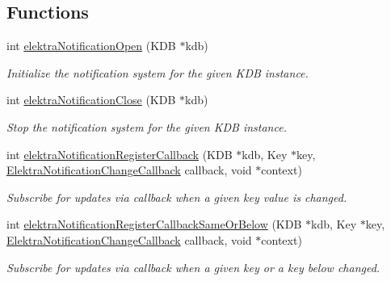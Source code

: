 \subsection*{Functions}
\begin{DoxyCompactItemize}
\item 
int \hyperlink{group__kdbnotification_gaeae96154abdb5fdbf1b34a01e2b23e44}{elektra\+Notification\+Open} (K\+DB $\ast$kdb)
\begin{DoxyCompactList}\small\item\em Initialize the notification system for the given K\+DB instance. \end{DoxyCompactList}\item 
int \hyperlink{group__kdbnotification_ga5685dafbd4131011365628d6d9213594}{elektra\+Notification\+Close} (K\+DB $\ast$kdb)
\begin{DoxyCompactList}\small\item\em Stop the notification system for the given K\+DB instance. \end{DoxyCompactList}\item 
int \hyperlink{group__kdbnotification_gab42738703162b3769b1336dcade47b18}{elektra\+Notification\+Register\+Callback} (K\+DB $\ast$kdb, Key $\ast$key, \hyperlink{group__kdbnotification_gad0d800e32a72d89780321e5723301eb9}{Elektra\+Notification\+Change\+Callback} callback, void $\ast$context)
\begin{DoxyCompactList}\small\item\em Subscribe for updates via callback when a given key value is changed. \end{DoxyCompactList}\item 
int \hyperlink{group__kdbnotification_ga374edd4f4fff527d6511ce4d0df62681}{elektra\+Notification\+Register\+Callback\+Same\+Or\+Below} (K\+DB $\ast$kdb, Key $\ast$key, \hyperlink{group__kdbnotification_gad0d800e32a72d89780321e5723301eb9}{Elektra\+Notification\+Change\+Callback} callback, void $\ast$context)
\begin{DoxyCompactList}\small\item\em Subscribe for updates via callback when a given key or a key below changed. \end{DoxyCompactList}\end{DoxyCompactItemize}
